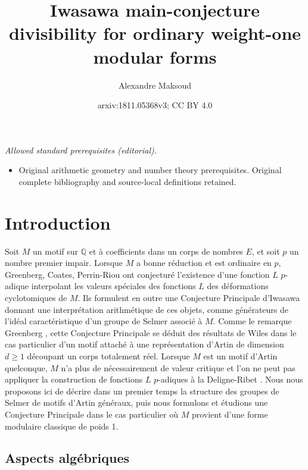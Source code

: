 \documentclass[12pt]{amsart}
\title{Iwasawa main-conjecture divisibility for ordinary weight-one modular forms}
\author{Alexandre Maksoud}
\date{arxiv:1811.05368v3; CC BY 4.0}
\newcommand\bQ{\mathbb{Q}}
\theoremstyle{defstyle}
\theoremstyle{thmstyle}
\begin{document}
\maketitle
\noindent\textit{Allowed standard prerequisites (editorial).}\begin{itemize}
\item Original arithmetic geometry and number theory prerequisites. Original complete bibliography and source-local definitions retained.
\end{itemize}\medskip
	\section*{Introduction}
Soit $M$ un motif sur $\bQ$ et à coefficients dans un corps de nombres $E$, et soit $p$ un nombre premier impair. Lorsque $M$ a bonne réduction et est ordinaire en $p$, Greenberg, Coates, Perrin-Riou \cite{greenbergdeformation,coatesmotivic,prasterisque} ont conjecturé l'existence d'une fonction $L$ $p$-adique interpolant les valeurs spéciales des fonctions $L$ des déformations cyclotomiques de $M$. Ils formulent en outre une Conjecture Principale d'Iwasawa donnant une interprétation arithmétique de ces objets, comme générateurs de l'idéal caractéristique d'un groupe de Selmer associé à $M$. 
Comme le remarque Greenberg \cite{greenbergartinII}, cette Conjecture Principale se déduit des résultats de Wiles \cite{wiles1990iwasawa} dans le cas particulier d'un motif attaché à une représentation d'Artin de dimension $d\geq 1$ découpant un corps totalement réel. Lorsque $M$ est un motif d'Artin quelconque, $M$ n'a plus de nécessairement de valeur critique et l'on ne peut pas appliquer la construction de fonctions $L$ $p$-adiques à la Deligne-Ribet \cite{deligneribet}.
Nous nous proposons ici de décrire dans un premier temps la structure des groupes de Selmer de motifs d'Artin généraux, puis nous formulons et étudions une Conjecture Principale dans le cas particulier où $M$ provient d'une forme modulaire classique de poids 1. 

\subsection*{Aspects algébriques}
\end{document}
